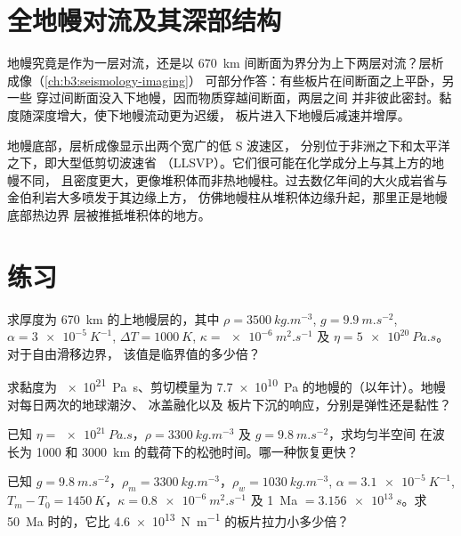 \section{全地幔对流及其深部结构}

地幔究竟是作为一层对流，还是以
\qty{670}{km} 间断面为界分为上下两层对流？层析成像（\cref{ch:b3:seismology-imaging}）
可部分作答：有些板片在间断面之上平卧，另一些
穿过间断面没入下地幔，因而物质穿越间断面，两层之间
并非彼此密封。黏度随深度增大，使下地幔流动更为迟缓，
板片进入下地幔后减速并增厚。

地幔底部，层析成像显示出两个宽广的低 S 波速区，
分别位于非洲之下和太平洋之下，即大型低剪切波速省
（LLSVP）。它们很可能在化学成分上与其上方的地幔不同，
且密度更大，更像堆积体而非热地幔柱。过去数亿年间的大火成岩省与
金伯利岩大多喷发于其边缘上方，
仿佛地幔柱从堆积体边缘升起，那里正是地幔底部热边界
层被推抵堆积体的地方。

\section{练习}

\begin{exercise}[$\star$]\label{exo:b3:mantle-convection:1}
求厚度为 \qty{670}{km} 的上地幔层的，其中
$\rho = \qty{3500}{kg.m^{-3}}$, $g = \qty{9.9}{m.s^{-2}}$, $\alpha =
\qty{3e-5}{K^{-1}}$, $\Delta T = \qty{1000}{K}$, $\kappa =
\qty{e-6}{m^2.s^{-1}}$ 及 $\eta = \qty{5e20}{Pa.s}$。对于自由滑移边界，
该值是临界值的多少倍？
\end{exercise}

\begin{exercise}[$\star$]\label{exo:b3:mantle-convection:2}
求黏度为 \qty{e21}{Pa.s}、剪切模量为
\qty{7.7e10}{Pa} 的地幔的（以年计）。地幔对每日两次的地球潮汐、
冰盖融化以及
板片下沉的响应，分别是弹性还是黏性？
\end{exercise}

\begin{exercise}[$\star$]\label{exo:b3:mantle-convection:3}
已知 $\eta = \qty{e21}{Pa.s}$，$\rho = \qty{3300}{kg.m^{-3}}$ 及 $g =
\qty{9.8}{m.s^{-2}}$，求均匀半空间
在波长为 1000 和 \qty{3000}{km} 的载荷下的松弛时间。哪一种恢复更快？
\end{exercise}

\begin{exercise}[$\star$]\label{exo:b3:mantle-convection:4}
已知 $g = \qty{9.8}{m.s^{-2}}$，$\rho_m = \qty{3300}{kg.m^{-3}}$，$\rho_w =
\qty{1030}{kg.m^{-3}}$, $\alpha = \qty{3.1e-5}{K^{-1}}$, $T_m - T_0 =
\qty{1450}{K}$，$\kappa = \qty{0.8e-6}{m^2.s^{-1}}$ 及 \qty{1}{Ma} $=
\qty{3.156e13}{s}$。求 \qty{50}{Ma} 时的，它比
\qty{4.6e13}{N.m^{-1}} 的板片拉力小多少倍？
\end{exercise}

